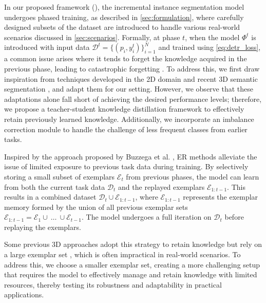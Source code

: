 In our proposed framework (), the incremental instance segmentation model undergoes phased training, as described in \cref{sec:formulation}, where carefully designed subsets of the dataset are introduced to handle various real-world scenarios discussed in \cref{sec:scenarios}. Formally, at phase $t$, when the model $\Phi^t$ is introduced with input data $\mathcal{D}^t = \{(p_i, y_i^t)\}_{i=1}^N$ and trained using \cref{eq:detr_loss}, a common issue arises where it tends to forget the knowledge acquired in the previous phase, leading to catastrophic forgetting \cite{mccloskey1989catastrophic}. To address this, we first draw inspiration from techniques developed in the 2D domain \cite{rebuffi2017icarl, li2017learning} and recent 3D semantic segmentation \cite{su2024balanced, Yang_2023_CVPR}, and adapt them for our setting. 
However, we observe that these adaptations alone fall short of achieving the desired performance levels; therefore, we propose a teacher-student knowledge distillation framework to effectively retain previously learned knowledge.
Additionally, we incorporate an imbalance correction module to handle the challenge of less frequent classes from earlier tasks.

Inspired by the approach proposed by Buzzega et al. \cite{buzzega2020dark}, ER methods alleviate the issue of limited exposure to previous task data during training. By selectively storing a small subset of exemplars $\mathcal{E}_t$ from previous phases, the model can learn from both the current task data $\mathcal{D}_t$ and the replayed exemplars $\mathcal{E}_{1:t-1}$. This results in a combined dataset $\mathcal{D}_t \cup \mathcal{E}_{1:t-1}$, where $\mathcal{E}_{1:t-1}$ represents the exemplar memory formed by the union of all previous exemplar sets $\mathcal{E}_{1:t-1} = \mathcal{E}_{1}\cup~\dots~\cup \mathcal{E}_{t-1}$. The model undergoes a full iteration on $\mathcal{D}_t$ before replaying the exemplars. 

Some previous 3D approaches adopt this strategy to retain knowledge but rely on a large exemplar set \cite{boudjoghra20243d}, which is often impractical in real-world scenarios. 
To address this, we choose a smaller exemplar set, creating a more challenging setup that requires the model to effectively manage and retain knowledge with limited resources, thereby testing its robustness and adaptability in practical applications.

